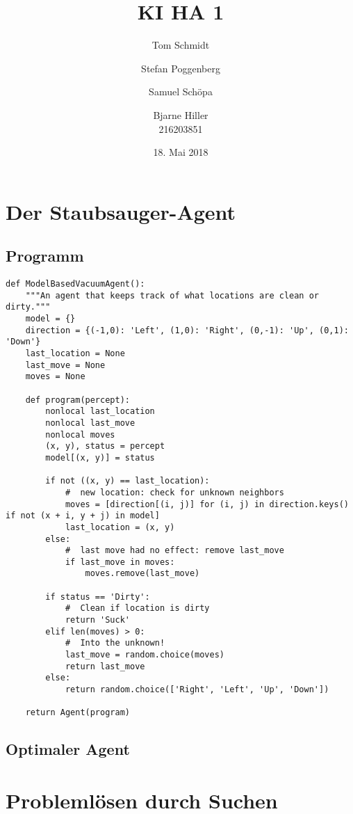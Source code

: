 \documentclass[fleqn]{scrartcl}
\author{Tom Schmidt\\ \and Stefan Poggenberg\\ \and Samuel Schöpa\\ \and Bjarne Hiller\\216203851}
\title{KI HA 1}
\date{18. Mai 2018}
\begin{document}
\maketitle
\section{Der Staubsauger-Agent}
\subsection{Programm}
\begin{lstlisting}
def ModelBasedVacuumAgent():
    """An agent that keeps track of what locations are clean or dirty."""
    model = {}
    direction = {(-1,0): 'Left', (1,0): 'Right', (0,-1): 'Up', (0,1): 'Down'}
    last_location = None
    last_move = None
    moves = None
    
    def program(percept):
        nonlocal last_location
        nonlocal last_move
        nonlocal moves
        (x, y), status = percept
        model[(x, y)] = status

        if not ((x, y) == last_location):
            #  new location: check for unknown neighbors
            moves = [direction[(i, j)] for (i, j) in direction.keys() if not (x + i, y + j) in model]
            last_location = (x, y)
        else:
            #  last move had no effect: remove last_move
            if last_move in moves:
                moves.remove(last_move)

        if status == 'Dirty':
            #  Clean if location is dirty
            return 'Suck'
        elif len(moves) > 0:
            #  Into the unknown!
            last_move = random.choice(moves)
            return last_move
        else:
            return random.choice(['Right', 'Left', 'Up', 'Down'])
        
    return Agent(program)
\end{lstlisting}
\subsection{Optimaler Agent}
\section{Problemlösen durch Suchen}
\end{document}

